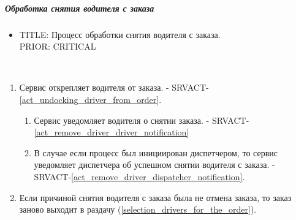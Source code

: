 \subparagraph{Обработка снятия водителя с заказа} \label{remove_driver_from_order}

  \begin{itemize}

   \item {
      TITLE: Процесс обработки снятия водителя с заказа.
      \\
      PRIOR: CRITICAL\\
   }

   \end{itemize}


    	\begin{alg}  \label{remove_driver_from_order_alg} \mbox{}\\

        \begin{enumerate}

          \item Сервис открепляет водителя от заказа. - SRVACT-\ref{act_undocking_driver_from_order}.

          \begin{enumerate}

            \item Сервис уведомляет водителя о снятии заказа. - SRVACT-\ref{act_remove_driver_driver_notification} 
            
            \item В случае если процесс был инициирован диспетчером, то сервис уведомляет диспетчера об успешном снятии водителя с заказа. -  SRVACT-\ref{act_remove_driver_dispatcher_notification}.

          \end{enumerate}
          
          \item Если причиной снятия водителя с заказа была не отмена заказа, то заказ заново выходит в раздачу (\ref{selection_drivers_for_the_order}).

        \end{enumerate}
      \end{alg}